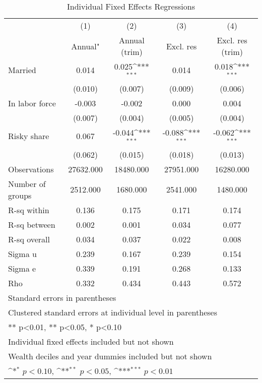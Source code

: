 \begin{table}[htbp]\centering
\def\sym#1{\ifmmode^{#1}\else\(^{#1}\)\fi}
\caption{Individual Fixed Effects Regressions}
\begin{tabular}{l*{4}{c}}
\toprule
          &\multicolumn{1}{c}{(1)}&\multicolumn{1}{c}{(2)}&\multicolumn{1}{c}{(3)}&\multicolumn{1}{c}{(4)}\\
          &\multicolumn{1}{c}{Annual"}&\multicolumn{1}{c}{Annual (trim)}&\multicolumn{1}{c}{Excl. res}&\multicolumn{1}{c}{Excl. res (trim)}\\
\midrule
Married   &    0.014         &    0.025\sym{***}&    0.014         &    0.018\sym{***}\\
          &  (0.010)         &  (0.007)         &  (0.009)         &  (0.006)         \\
In labor force&   -0.003         &   -0.002         &    0.000         &    0.004         \\
          &  (0.007)         &  (0.004)         &  (0.005)         &  (0.004)         \\
Risky share&    0.067         &   -0.044\sym{***}&   -0.088\sym{***}&   -0.062\sym{***}\\
          &  (0.062)         &  (0.015)         &  (0.018)         &  (0.013)         \\
\midrule
Observations&27632.000         &18480.000         &27951.000         &16280.000         \\
Number of groups& 2512.000         & 1680.000         & 2541.000         & 1480.000         \\
R-sq within&    0.136         &    0.175         &    0.171         &    0.174         \\
R-sq between&    0.002         &    0.001         &    0.034         &    0.077         \\
R-sq overall&    0.034         &    0.037         &    0.022         &    0.008         \\
Sigma u   &    0.239         &    0.167         &    0.239         &    0.154         \\
Sigma e   &    0.339         &    0.191         &    0.268         &    0.133         \\
Rho       &    0.332         &    0.434         &    0.443         &    0.572         \\
\bottomrule
\multicolumn{5}{l}{\footnotesize Standard errors in parentheses}\\
\multicolumn{5}{l}{\footnotesize Clustered standard errors at individual level in parentheses}\\
\multicolumn{5}{l}{\footnotesize *** p<0.01, ** p<0.05, * p<0.10}\\
\multicolumn{5}{l}{\footnotesize Individual fixed effects included but not shown}\\
\multicolumn{5}{l}{\footnotesize Wealth deciles and year dummies included but not shown}\\
\multicolumn{5}{l}{\footnotesize \sym{*} \(p<0.10\), \sym{**} \(p<0.05\), \sym{***} \(p<0.01\)}\\
\end{tabular}
\end{table}
